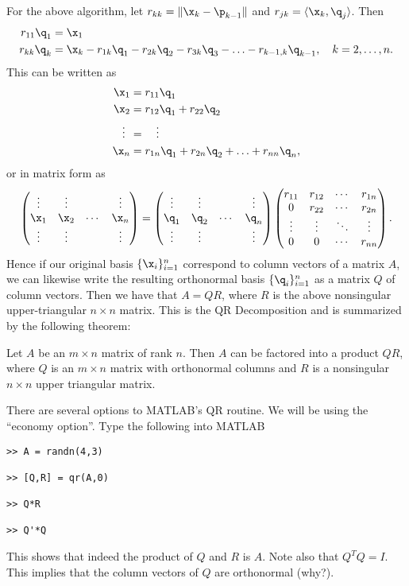 For the above algorithm, let $r_{k k} = \|\x_k - \p_{k-1}\|$ and
$r_{j k} = \langle \x_k, \q_j\rangle$.  Then
\begin{align*}
r_{1 1} \q_1 &= \x_1\\
r_{k k} \q_k &= \x_k - r_{1 k} \q_1 - r_{2 k} \q_2 - r_{3 k} \q_3 -
\ldots - r_{k-1, k} \q_{k-1},\quad k=2,\ldots,n.
\end{align*}
This can be written as
\begin{align*}
\x_1 &= r_{1 1} \q_1\\
\x_2 &= r_{1 2} \q_1 + r_{2 2} \q_2\\
\vdots \:\: &= \quad \vdots\\
\x_n &= r_{1 n} \q_1 + r_{2 n} \q_2 + \ldots + r_{n n} \q_{n},
\end{align*}
or in matrix form as
\[
\begin{pmatrix}
\vdots & \vdots & & \vdots\\
\x_1 & \x_2 & \cdots & \x_n\\
\vdots & \vdots & & \vdots
\end{pmatrix}
=
\begin{pmatrix}
\vdots & \vdots & & \vdots\\
\q_1 & \q_2 & \cdots & \q_n\\
\vdots & \vdots & & \vdots
\end{pmatrix}
\begin{pmatrix}
r_{1 1} & r_{1 2} & \cdots & r_{1 n}\\
0 & r_{2 2} & \cdots & r_{2 n}\\
\vdots & \vdots & \ddots & \vdots\\
0 & 0 & \cdots & r_{n n}
\end{pmatrix}.
\]
Hence if our original basis $\{\x_i\}_{i=1}^n$ correspond to column
vectors of a matrix $A$, we can likewise write the resulting
orthonormal basis $\{\q_i\}_{i=1}^n$ as a matrix $Q$ of column
vectors.  Then we have that $A = Q R$, where $R$ is the above
nonsingular upper-triangular $n\times n$ matrix.  This is the QR
Decomposition and is summarized by the following theorem:
\vspace{5mm}
\begin{theorem}
Let $A$ be an $m\times n$ matrix of rank $n$.  Then $A$ can be
factored into a product $Q R$, where $Q$ is an $m\times n$ matrix
with orthonormal columns and $R$ is a nonsingular $n \times n$ upper
triangular matrix.
\end{theorem}

There are several options to MATLAB's QR routine.  We will be using
the ``economy option''.  Type the following into MATLAB
\begin{verbatim}
>> A = randn(4,3)

>> [Q,R] = qr(A,0)

>> Q*R

>> Q'*Q
\end{verbatim}
This shows that indeed the product of $Q$ and $R$ is $A$.  Note also
that $Q^T Q = I$.  This implies that the column vectors of $Q$ are
orthonormal (why?).

